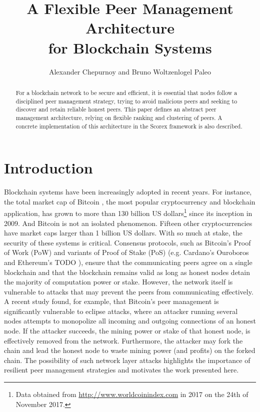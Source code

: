 \documentclass[]{llncs}
\begin{document}
\title{A Flexible Peer Management Architecture \\ for Blockchain Systems}

\author{Alexander Chepurnoy and Bruno Woltzenlogel Paleo} 

\maketitle

\begin{abstract}
For a blockchain network to be secure and efficient, 
it is essential that nodes follow a disciplined peer management strategy, 
trying to avoid malicious peers and seeking to discover 
and retain reliable honest peers.
This paper defines an abstract peer management architecture, 
relying on flexible ranking and clustering of peers. 
A concrete implementation of this architecture in the 
Scorex framework is also described.
\end{abstract}


\section{Introduction}

Blockchain systems have been increasingly adopted in recent years. 
For instance, the total market cap of Bitcoin \cite{TODO}, the most popular cryptocurrency 
and blockchain application, has grown to more than 130 billion US 
dollars\footnote{Data obtained from \url{http://www.worldcoinindex.com} in 2017 
on the 24th of November 2017.} since its inception in 2009. 
And Bitcoin is not an isolated phenomenon. Fifteen other cryptocurrencies 
have market caps larger than 1 billion US dollars. With so much at stake, 
the security of these systems is critical. Consensus 
protocols, such as Bitcoin's Proof of Work (PoW) \cite{TODO} 
and variants of Proof of Stake (PoS) \cite{TODO} 
(e.g. Cardano's Ouroboros \cite{TODO} and Ethereum's TODO \cite{TODO}), 
ensure that the communicating peers agree on a single blockchain and 
that the blockchain remains valid as long as honest nodes detain the majority 
of computation power or stake. However, the network itself is vulnerable to attacks
that may prevent the peers from communicating effectively. A recent study \cite{TODO}
found, for example, that Bitcoin's peer management is significantly vulnerable
to eclipse attacks, where an attacker running several nodes attempts to monopolize 
all incoming and outgoing connections of an honest node. If the attacker succeeds,
the mining power or stake of that honest node, is effectively removed from the network.
Furthermore, the attacker may fork the chain and lead the honest node 
to waste mining power (and profits) on the forked chain. The possibility of such 
network layer attacks highlights the importance of resilient peer management strategies 
and motivates the work presented here.
\end{document}
